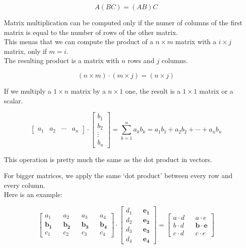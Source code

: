 \documentclass[a4paper]{article}
\begin{document}
\[
    A(BC)=(AB)C
\]

Matrix multiplication can be computed only if the numer of columns of the first matrix is equal to the number of rows of the other matrix. \\
This menas that we can compute the product of a \(n \times m\) matrix with a \(i \times j\) matrix, only if \(m=i\). \\
The resulting product is a matrix with \(n\) rows and \(j\) columns.

\[
    (n \times m) \cdot (m \times j) = (n \times j)
\]

If we multiply a \(1 \times n\) matrix by a \(n \times 1\) one, the result is a \(1 \times 1\) matrix or a scalar.

\[
    \begin{bmatrix} 
        a_1 & a_2 & \cdots & a_n
    \end{bmatrix}
    \cdot
    \begin{bmatrix} 
        b_1 \\
        b_2 \\
        \vdots \\
        b_n
    \end{bmatrix}
    = \sum_{k=1}^{n} a_k b_k = a_1 b_1 + a_2 b_2 + \cdots + a_n b_n
\]

This operation is pretty much the same as the dot product in vectors.

For bigger matrices, we apply the same `dot product' between every row and every column. \\
Here is an example:

\[
    \begin{bmatrix} 
        a_1 && a_2 && a_3 && a_4 \\
        \mathbf{b_1} && \mathbf{b_2} && \mathbf{b_3} && \mathbf{b_4} \\
        c_1 && c_2 && c_3 && c_4
    \end{bmatrix}
    \cdot
    \begin{bmatrix} 
        d_1 && \mathbf{e_1} \\
        d_2 && \mathbf{e_2} \\
        d_3 && \mathbf{e_3} \\
        d_4 && \mathbf{e_4}
    \end{bmatrix}
    =
    \begin{bmatrix} 
        a \cdot d && a \cdot e \\
        b \cdot d && \mathbf{b \cdot e} \\
        c \cdot d && c \cdot e
    \end{bmatrix}
\]
\end{document}
